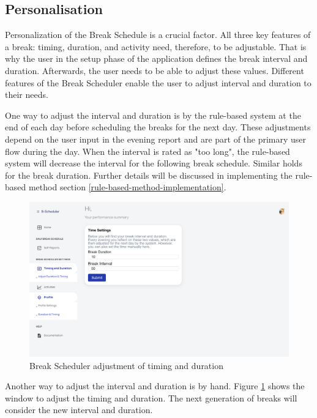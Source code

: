 \documentclass{hasel_thesis}
\begin{document}
\subsection{Personalisation} \label{personalization}
Personalization of the Break Schedule is a crucial factor. All three key features of a break: timing, duration, and activity need, therefore, to be adjustable. That is why the user in the setup phase of the application defines the break interval and duration. Afterwards, the user needs to be able to adjust these values. Different features of the Break Scheduler enable the user to adjust interval and duration to their needs.

One way to adjust the interval and duration is by the rule-based system at the end of each day before scheduling the breaks for the next day. These adjustments depend on the user input in the evening report and are part of the primary user flow during the day. When the interval is rated as "too long", the rule-based system will decrease the interval for the following break schedule. Similar holds for the break duration. Further details will be discussed in implementing the rule-based method section \ref{rule-based-method-implementation}.

\begin{figure}[htp]
    \centering
    \includegraphics[width=15cm]{hasel_thesis/images/adjust_timing.png}
    \caption{Break Scheduler adjustment of timing and duration}
    \label{fig:adjust_timing}
\end{figure}

Another way to adjust the interval and duration is by hand. Figure \ref{fig:adjust_timing} shows the window to adjust the timing and duration. The next generation of breaks will consider the new interval and duration.
\end{document}
